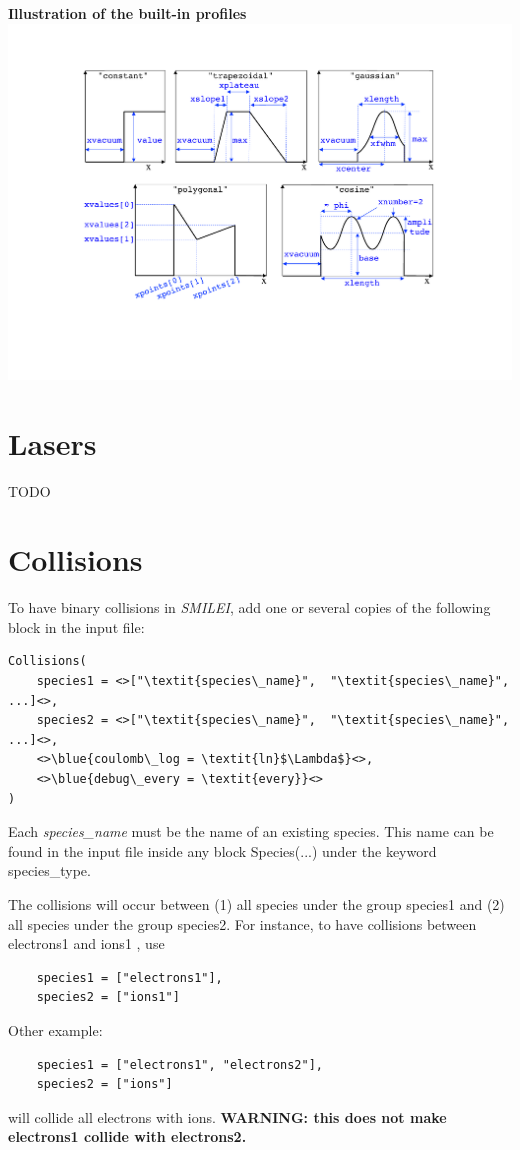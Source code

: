 \documentclass[11pt]{article}
\newcommand{\code}[1]{\colorbox{yellow!15}{\ttfamily #1}}
\newcommand{\val}[1]{{\ttfamily \textit{#1}}}
\newcommand{\blue}[1]{{\color{blue} #1}}
\newcommand{\smilei}{\emph{SMILEI}\xspace}
\newcommand{\todo}{{\color{red}TODO}}
\begin{document}
\textbf{Illustration of the built-in profiles}
{
\center
\includegraphics[width=17cm]{pythonprofiles.pdf} 
}
\endgroup


\section{Lasers \label{sec:laser}}
\todo


\section{Collisions}

To have binary collisions in \smilei, add one or several copies of the following block in the input file:
\begin{lstlisting}
Collisions(
	species1 = <>["\textit{species\_name}",  "\textit{species\_name}",  ...]<>,
	species2 = <>["\textit{species\_name}",  "\textit{species\_name}",  ...]<>,
	<>\blue{coulomb\_log = \textit{ln}$\Lambda$}<>,
	<>\blue{debug\_every = \textit{every}}<>
)
\end{lstlisting}

Each \val{species\_name} must be the name of an existing species. This name can be
found in the input file inside any block \code{Species(...)} under the keyword \code{species\_type}.

The collisions will occur between (1) all species under the group \code{species1} and (2) all species under the group \code{species2}.
For instance, to have collisions between \code{electrons1} and \code{ions1} , use
\begin{lstlisting}
	species1 = ["electrons1"],
	species2 = ["ions1"]
\end{lstlisting}
Other example:
\begin{lstlisting}
	species1 = ["electrons1", "electrons2"],
	species2 = ["ions"]
\end{lstlisting}
will collide all electrons with ions.
\textbf{WARNING: this does not make \code{electrons1} collide with \code{electrons2}.}
\end{document}

